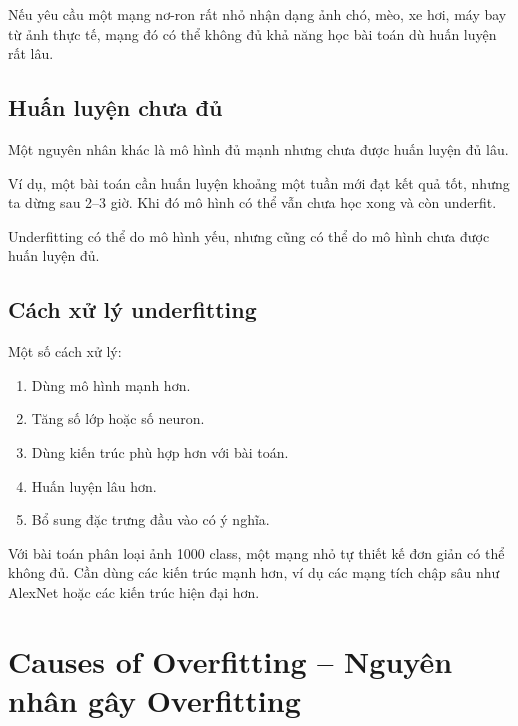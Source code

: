 \begin{vidu}
Nếu yêu cầu một mạng nơ-ron rất nhỏ nhận dạng ảnh chó, mèo, xe hơi, máy bay từ ảnh thực tế, mạng đó có thể không đủ khả năng học bài toán dù huấn luyện rất lâu.
\end{vidu}

\subsection{Huấn luyện chưa đủ}

Một nguyên nhân khác là mô hình đủ mạnh nhưng chưa được huấn luyện đủ lâu.

Ví dụ, một bài toán cần huấn luyện khoảng một tuần mới đạt kết quả tốt, nhưng ta dừng sau 2--3 giờ. Khi đó mô hình có thể vẫn chưa học xong và còn underfit.

\begin{ghinho}
Underfitting có thể do mô hình yếu, nhưng cũng có thể do mô hình chưa được huấn luyện đủ.
\end{ghinho}

\subsection{Cách xử lý underfitting}

Một số cách xử lý:

\begin{enumerate}
    \item Dùng mô hình mạnh hơn.
    \item Tăng số lớp hoặc số neuron.
    \item Dùng kiến trúc phù hợp hơn với bài toán.
    \item Huấn luyện lâu hơn.
    \item Bổ sung đặc trưng đầu vào có ý nghĩa.
\end{enumerate}

\begin{vidu}
Với bài toán phân loại ảnh 1000 class, một mạng nhỏ tự thiết kế đơn giản có thể không đủ. Cần dùng các kiến trúc mạnh hơn, ví dụ các mạng tích chập sâu như AlexNet hoặc các kiến trúc hiện đại hơn.
\end{vidu}

\section{Causes of Overfitting -- Nguyên nhân gây Overfitting}

